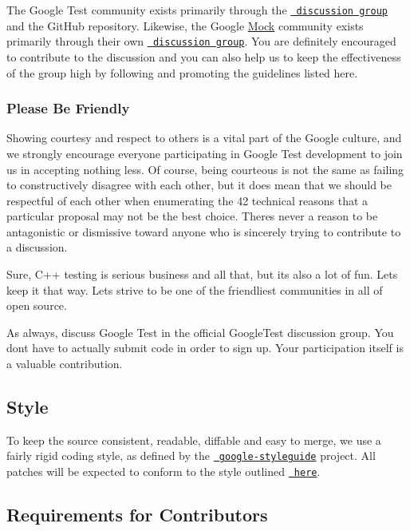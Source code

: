 The Google Test community exists primarily through the \href{http://groups.google.com/group/googletestframework}{\texttt{ discussion group}} and the Git\+Hub repository. Likewise, the Google \mbox{\hyperlink{class_mock}{Mock}} community exists primarily through their own \href{http://groups.google.com/group/googlemock}{\texttt{ discussion group}}. You are definitely encouraged to contribute to the discussion and you can also help us to keep the effectiveness of the group high by following and promoting the guidelines listed here.

\subsubsection*{Please Be Friendly}

Showing courtesy and respect to others is a vital part of the Google culture, and we strongly encourage everyone participating in Google Test development to join us in accepting nothing less. Of course, being courteous is not the same as failing to constructively disagree with each other, but it does mean that we should be respectful of each other when enumerating the 42 technical reasons that a particular proposal may not be the best choice. There\textquotesingle{}s never a reason to be antagonistic or dismissive toward anyone who is sincerely trying to contribute to a discussion.

Sure, C++ testing is serious business and all that, but it\textquotesingle{}s also a lot of fun. Let\textquotesingle{}s keep it that way. Let\textquotesingle{}s strive to be one of the friendliest communities in all of open source.

As always, discuss Google Test in the official Google\+Test discussion group. You don\textquotesingle{}t have to actually submit code in order to sign up. Your participation itself is a valuable contribution.

\subsection*{Style}

To keep the source consistent, readable, diffable and easy to merge, we use a fairly rigid coding style, as defined by the \href{https://github.com/google/styleguide}{\texttt{ google-\/styleguide}} project. All patches will be expected to conform to the style outlined \href{https://google.github.io/styleguide/cppguide.html}{\texttt{ here}}.

\subsection*{Requirements for Contributors}

